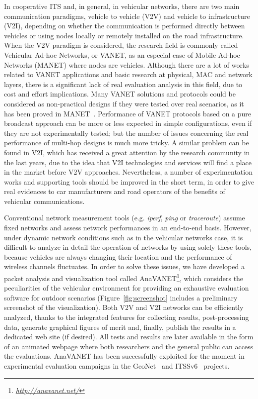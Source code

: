 \documentclass[fonts]{icst}
\begin{document}
In cooperative ITS and, in general, in vehicular networks, there are two main communication paradigms, vehicle to vehicle (V2V) and vehicle to infrastructure (V2I), depending on whether the communication is performed directly between vehicles or using nodes locally or remotely installed on the road infrastructure.
When the V2V paradigm is considered, the research field is commonly called Vehicular Ad-hoc Networks, or VANET, as an especial case of Mobile Ad-hoc Networks (MANET) where nodes are vehicles. Although there are a lot of works related to VANET applications and basic research at physical, MAC and network layers, there is a significant lack of real evaluation analysis in this field, due to cost and effort implications. 
Many VANET solutions and protocols could be considered as non-practical designs if they were tested over real scenarios, as it has been proved in MANET~\cite{Tschudin03}. Performance of VANET protocols based on a pure broadcast
approach can be more or less expected in simple configurations, even if they are
not experimentally tested; but the number of issues concerning the real performance of multi-hop designs is much more tricky.  A similar problem can be found in V2I, which has received a great attention by the research community in the last years, due to the idea that V2I technologies and services will find a place in the market before V2V approaches. Nevertheless, a number of experimentation works and supporting tools should be improved in the short term, in order to give real evidences to car manufacturers and road operators of the benefits of vehicular communications.

Conventional network measurement tools (e.g. \textit{iperf}, \textit{ping} or \textit{traceroute}) assume fixed networks and assess network performances in an end-to-end
basis. However, under dynamic network conditions such as in the vehicular networks case, it is difficult to analyze in detail the operation of networks by using solely these tools, because vehicles are always changing their location and the performance of wireless channels fluctuates. In order to solve
these issues, we have developed a packet analysis and visualization tool called
AnaVANET\footnote{\textit{\href{http://anavanet.net/}{http://anavanet.net/}}}, which considers the peculiarities of the vehicular environment for providing an exhaustive evaluation software for outdoor scenarios (Figure~\ref{fig:screenshot} includes a preliminary screenshot of the visualization). 
Both V2V and V2I networks can be efficiently analyzed, thanks to the integrated features for collecting results, post-processing data, generate graphical figures of merit and, finally, publish the results in a dedicated web site (if desired). 
All tests and results are later available in the form of an animated webpage where both researchers and the general public can access the evaluations. 
AnaVANET has been successfully exploited for the moment in experimental evaluation campaigns in the GeoNet~\cite{GeoNet-D.7} and ITSSv6~\cite{ITSSv6-D4.2} projects.
\end{document}
